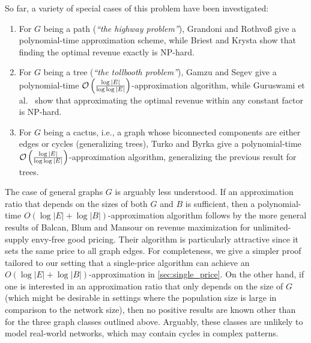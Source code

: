 So far, a variety of special cases of this problem have been investigated:
\begin{enumerate}[nosep]
    \item For $G$ being a path (\emph{``the highway problem''}), Grandoni and Rothvo{\ss} \cite{grandoni2016pricing} give a polynomial-time approximation scheme, while Briest and Krysta \cite{Briest06} show that finding the optimal revenue exactly is NP-hard.
    \item For $G$ being a tree (\emph{``the tollbooth problem''}), Gamzu and Segev \cite{Gamzu10} give a polynomial-time $\mathcal{O} \left( \frac{\log |E|}{\log \log |E|} \right)$-ap\-prox\-i\-ma\-tion algorithm, while Guruswami et al.~\cite{Guruswami05} show that approximating the optimal revenue within any constant factor is NP-hard.
    \item For $G$ being a cactus, i.e., a graph whose biconnected components are either edges or cycles (generalizing trees), Turko and Byrka \cite{cactus23} give a polynomial-time $\mathcal{O} \left( \frac{\log |E|}{\log \log |E|} \right)$-ap\-prox\-i\-ma\-tion algorithm, generalizing the previous result for trees.
\end{enumerate}

The case of general graphs $G$ is arguably less understood. If an approximation ratio that depends on the sizes of both $G$ and $B$ is sufficient, then a polynomial-time $O(\log |E| + \log |B|)$-ap\-prox\-i\-ma\-tion algorithm follows by the more general results of Balcan, Blum and Mansour \cite{Balcan08} on revenue maximization for unlimited-supply envy-free good pricing. Their algorithm is particularly attractive since it sets the same price to all graph edges. For completeness, we give a simpler proof tailored to our setting that a single-price algorithm can achieve an $O(\log |E| + \log |B|)$-ap\-prox\-i\-ma\-tion in \cref{sec:single_price}. On the other hand, if one is interested in an approximation ratio that only depends on the size of $G$ (which might be desirable in settings where the population size is large in comparison to the network size), then no positive results are known other than for the three graph classes outlined above. Arguably, these classes are unlikely to model real-world networks, which may contain cycles in complex patterns. 

